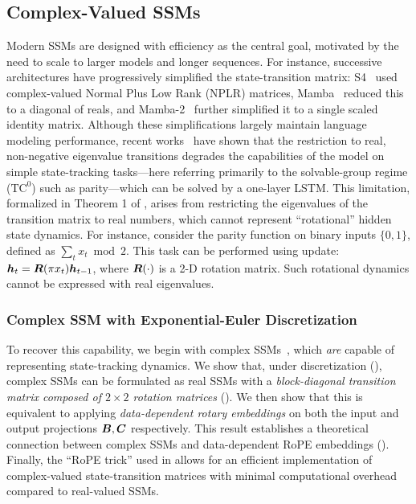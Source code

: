 \subsection{Complex-Valued SSMs}
\label{sec:method:complex}

Modern SSMs are designed with efficiency as the central goal, motivated by the need to scale to larger models and longer sequences.
For instance, successive architectures have progressively simplified the state-transition matrix: S4~\citep{S4} used complex-valued Normal Plus Low Rank (NPLR) matrices, Mamba~\citep{gu2024mambalineartimesequencemodeling} reduced this to a diagonal of reals, and Mamba-2~\citep{dao2024transformersssmsgeneralizedmodels} further simplified it to a single scaled identity matrix.
Although these simplifications largely maintain language modeling performance, recent works~\citep{merrill2025illusionstatestatespacemodels,sarrof2024expressivecapacitystatespace,grazzi2025unlockingstatetrackinglinearrnns} have shown that the restriction to real, non-negative eigenvalue transitions degrades the capabilities of the model on simple state-tracking tasks---here referring primarily to the solvable-group regime ($\text{TC}^0$) such as parity---which can be solved by a one-layer LSTM.
This limitation, formalized in Theorem 1 of \citep{grazzi2024mambacapableincontextlearning}, arises from restricting the eigenvalues of the transition matrix to real numbers, which cannot represent ``rotational'' hidden state dynamics.
For instance, consider the parity function on binary inputs $\{0,1\}$, defined as $\sum_t x_t \bmod 2$.
This task can be performed using update: ${\bm{h}}_t = {\bm{R}}(\pi x_t) {\bm{h}}_{t-1}$, where ${\bm{R}}(\cdot)$ is a 2-D rotation matrix. 
Such rotational dynamics cannot be expressed with real eigenvalues. 

\subsubsection{Complex SSM with Exponential-Euler Discretization}
To recover this capability, we begin with complex SSMs~, which \emph{are} capable of representing state-tracking dynamics. 
We show that, under discretization (), complex SSMs can be formulated as real SSMs with a \emph{block-diagonal transition matrix composed of $2 \times 2$ rotation matrices} (). 
We then show that this is equivalent to applying \emph{data-dependent rotary embeddings} on both the input and output projections ${\bm{B}}, {\bm{C}}$ respectively.
This result establishes a theoretical connection between complex SSMs and data-dependent RoPE embeddings ().
Finally, the ``RoPE trick'' used in \citet{su2023roformerenhancedtransformerrotary} allows for an efficient implementation of complex-valued state-transition matrices with minimal computational overhead compared to real-valued SSMs.

